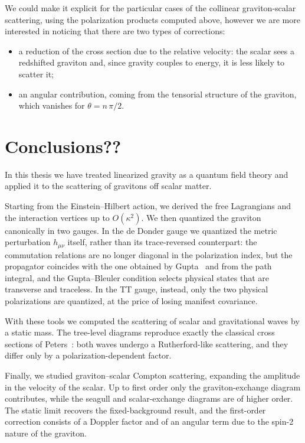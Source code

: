 \documentclass[12pt,a4paper,oneside]{article}
\numberwithin{equation}{section}   %
\begin{document}
We could make it explicit for the particular
cases of the collinear graviton-scalar scattering,
 using the polarization products computed above, however we 
 are more interested in noticing that there are two types of corrections:
\begin{itemize}
    \item a reduction of the cross section due to the relative velocity: the
    scalar sees a redshifted graviton and, since gravity couples to energy, it
    is less likely to scatter it;
    \item an angular contribution, coming from the tensorial structure of the
    graviton, which vanishes for $\theta=n\,\pi/2$.
\end{itemize}

\newpage
\section{Conclusions??}

In this thesis we have treated linearized gravity as a quantum field theory and
applied it to the scattering of gravitons off scalar matter.

Starting from the Einstein--Hilbert action, we derived the free Lagrangians and
the interaction vertices up to $O(\kappa^2)$. We then quantized the graviton
canonically in two gauges. In the de Donder gauge we quantized the metric
perturbation $h_{\mu\nu}$ itself, rather than its trace-reversed counterpart:
the commutation relations are no longer diagonal in the polarization index,
but the propagator coincides with the one obtained by Gupta~\cite{Gupta1952} and from the path
integral, and the Gupta--Bleuler condition selects physical states that are
transverse and traceless. In the TT gauge, instead, only the two physical
polarizations are quantized, at the price of losing manifest covariance.

With these tools we computed the scattering of scalar and gravitational waves
by a static mass. The tree-level diagrams reproduce exactly the classical
cross sections of Peters~\cite{Peters1976}: both waves undergo a Rutherford-like scattering, and
they differ only by a polarization-dependent factor.

Finally, we studied graviton--scalar Compton scattering, expanding the
amplitude in the velocity of the scalar. Up to first order only the
graviton-exchange diagram contributes, while the seagull and scalar-exchange
diagrams are of higher order. The static limit recovers the fixed-background
result, and the first-order correction consists of a Doppler factor and of an
angular term due to the spin-2 nature of the graviton.
\end{document}
